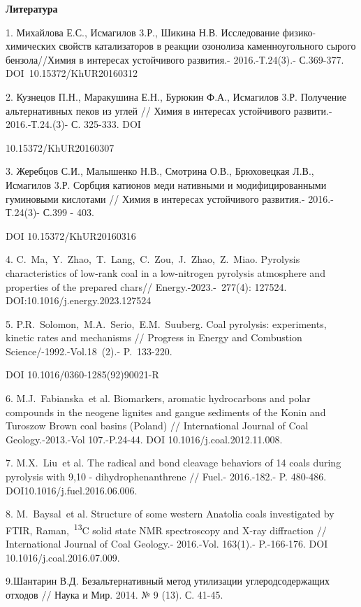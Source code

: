 \begin{center}
{\bfseries Литература}
\end{center}

\begin{noparindent}
1. Михайлова Е.С., Исмагилов 3.Р., Шикина Н.В. Исследование
физико-химических свойств катализаторов в реакции озонолиза
каменноугольного сырого бензола//Химия в интересах устойчивого
развития.- 2016.-Т.24(3).- С.369-377. DOI~10.15372/KhUR20160312

2. Кузнецов П.Н., Маракушина Е.Н., Бурюкин Ф.А., Исмагилов 3.Р.
Получение альтернативных пеков из углей // Химия в интересах устойчивого
развити.- 2016.-Т.24.(3)- С. 325-333. DOI

10.15372/KhUR20160307

3. Жеребцов С.И., Малышенко Н.В., Смотрина О.В., Брюховецкая Л.В.,
Исмагилов 3.Р. Сорбция катионов меди нативными и модифицированными
гуминовыми кислотами // Химия в интересах устойчивого развития.-
2016.-Т.24(3)- С.399 - 403.

DOI 10.15372/KhUR20160316

4. C.~Ma,~Y.~Zhao,~T.~Lang,~C.~Zou,~J.~Zhao,~Z.~Miao. Pyrolysis
characteristics of low-rank coal in a low-nitrogen pyrolysis atmosphere
and properties of the prepared chars// Energy.-2023.-~277(4): 127524.
DOI:10.1016/j.energy.2023.127524

5. P.R.~Solomon,~M.A.~Serio,~E.M.~Suuberg. Coal pyrolysis: experiments,
kinetic rates and mechanisms // Progress in Energy and Combustion
Science/-1992.-Vol.18~(2).- P.~133-220.

DOI 10.1016/0360-1285(92)90021-R

6. M.J.~Fabianska\emph{~}et al. Biomarkers, aromatic hydrocarbons and
polar compounds in the neogene lignites and gangue sediments of the
Konin and Turoszow Brown coal basins (Poland) // International Journal
of Coal Geology.-2013.-Vol 107.-P.24-44. DOI 10.1016/j.coal.2012.11.008.

7. M.X.~Liu\emph{~}et al. The radical and bond cleavage behaviors of 14
coals during pyrolysis with 9,10 - dihydrophenanthrene // Fuel.-
2016.-182.- P. 480-486. DOI10.1016/j.fuel.2016.06.006.

8. M.~Baysal\emph{~}et al. Structure of some western Anatolia coals
investigated by FTIR, Raman,~\textsuperscript{13}C solid state NMR
spectroscopy and X-ray diffraction // International Journal of Coal
Geology.- 2016.-Vol. 163(1).- P.-166-176. DOI
10.1016/j.coal.2016.07.009.

9.Шантарин В.Д. Безальтернативный метод утилизации углеродсодержащих
отходов // Наука и Мир. 2014. № 9 (13). С. 41-45.


\end{noparindent}
